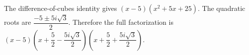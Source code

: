 The difference-of-cubes identity gives $(x-5)(x^2+5x+25)$. The quadratic roots are $\dfrac{-5\pm5i\sqrt3}{2}$. Therefore the full factorization is $\boxed{(x-5)(x+\dfrac{5}{2}-\dfrac{5i\sqrt3}{2})(x+\dfrac{5}{2}+\dfrac{5i\sqrt3}{2})}$.

